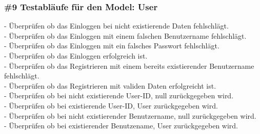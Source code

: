 \subsubsection*{\#9 Testabläufe für den Model: User}
- Überprüfen ob das Einloggen bei nicht existierende Daten fehlschlägt.\\
- Überprüfen ob das Einloggen mit einem falschen Benutzername fehlschlägt.\\
- Überprüfen ob das Einloggen mit ein falsches Passwort fehlschlägt.\\
- Überprüfen ob das Einloggen erfolgreich ist.\\
- Überprüfen ob das Registrieren mit einem bereits existierender Benutzername fehlschlägt.\\
- Überprüfen ob das Registrieren mit validen Daten erfolgreicht ist.\\
- Überprüfen ob bei nicht existierende User-ID, null zurückgegeben wird.\\
- Überprüfen ob bei existierende User-ID, User zurückgegeben wird.\\
- Überprüfen ob bei nicht existierender Benutzername, null zurückgegeben wird.\\
- Überprüfen ob bei existierender Benutzename, User zurückgegeben wird.
